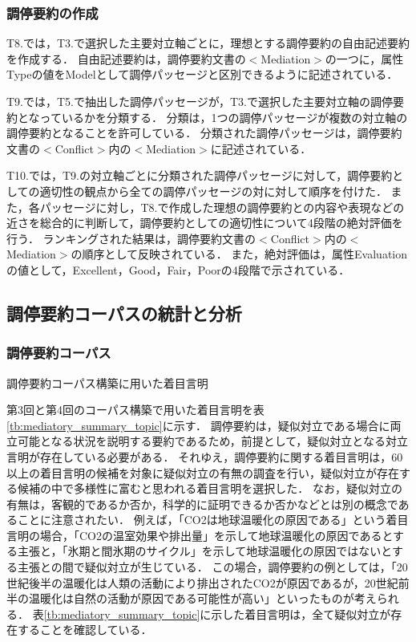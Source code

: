 \documentclass[japanese]{jnlp_1.4}
\begin{document}
\subsubsection{調停要約の作成}

T8.では，T3.で選択した{主要}対立軸ごとに，理想とする調停要約の自由記述要約を作成する．
自由記述要約は，調停要約文書の{\sf $<$Mediation$>$}の一つに，属性{\sf Type}の値を{\sf Model}として調停パッセージと区別できるように記述されている．

T9.では，T5.で抽出した調停パッセージが，T3.で選択した{主要}対立軸の調停要約となっているかを分類する．
分類は，1つの調停パッセージが複数の対立軸の調停要約となることを許可している．
分類された調停パッセージは，調停要約文書の{\sf $<$Conflict$>$}内の{\sf $<$Mediation$>$}に記述されている．

T10.では，T9.の対立軸ごとに分類された調停パッセージに対して，調停要約としての適切性の観点から{全て}の調停パッセージの対に対して順序を付けた．
また，各パッセージに対し，T8.で作成した理想の調停要約との内容や表現などの近さを総合的に判断して，調停要約としての適切性について4段階の絶対評価を行う．
ランキングされた結果は，調停要約文書の{\sf $<$Conflict$>$}内の{\sf $<$Mediation$>$}の順序として反映され{ている．}
また，絶対評価は，属性{\sf Evaluation}の値として，{\sf Excellent}，{\sf Good}，{\sf Fair}，{\sf Poor}の4段階で示されている．


\subsection{調停要約コーパスの統計と分析}
\label{ssc:mediatory_summary_analysis}


\subsubsection{調停要約コーパス}

\begin{table}[t]
 \caption{調停要約コーパス構築に用いた着目言明}
 \label{tb:mediatory_summary_topic}

\end{table}

第3回と第4回のコーパス構築で用いた着目言明を表\ref{tb:mediatory_summary_topic}に示す．
調停要約は，疑似対立である場合に両立可能となる状況を説明する要約であるため，前提として，疑似対立となる対立言明が存在している必要がある．
それゆえ，調停要約に関する着目言明は，60以上の着目言明の候補を対象に疑似対立の有無の調査を行い，疑似対立が存在する候補の中で多様性に富むと思われる着目言明を選択した．
{なお，}疑似対立の有無は，客観的であるか否か，科学的に証明できるか否かなどとは別の概念であることに注意されたい．
例えば，「CO2は地球温暖化の原因である」という着目言明の場合，「CO2の温室効果や排出量」を示して地球温暖化の原因であるとする主張と，「氷期と間氷期のサイクル」を示して地球温暖化の原因ではないとする主張との間で疑似対立が生じている．
この場合，調停要約の例としては，「20世紀後半の温暖化は人類の活動により排出されたCO2が原因であるが，20世紀前半の温暖化は自然の活動が原因である可能性が高い」といったものが考えられる．
表\ref{tb:mediatory_summary_topic}に示した着目言明は，全て疑似対立が存在することを確認している．
\end{document}
